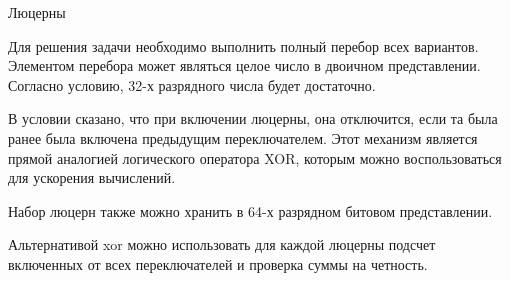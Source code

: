\begin{tutorial}{Люцерны}

Для решения задачи необходимо выполнить полный перебор всех вариантов. Элементом перебора может являться целое число в двоичном представлении. Согласно условию, 32-х разрядного числа будет достаточно.

В условии сказано, что при включении люцерны, она отключится, если та была ранее была включена предыдущим переключателем. Этот механизм является прямой аналогией логического оператора XOR, которым можно воспользоваться для ускорения вычислений.

Набор люцерн также можно хранить в 64-х разрядном битовом представлении.

Альтернативой xor можно использовать для каждой люцерны подсчет включенных от всех переключателей и проверка суммы на четность.

\end{tutorial}
